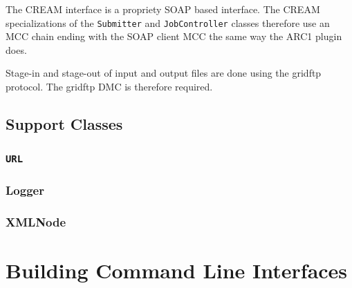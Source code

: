 \documentclass{book}
\newcommand{\Submitter}{\texttt{Submitter}}
\newcommand{\JobController}{\texttt{JobController}}
\newcommand{\URL}{\texttt{URL}}
\begin{document}
The CREAM interface is a propriety SOAP based interface. The CREAM
specializations of the {\Submitter} and {\JobController} classes
therefore use an MCC chain ending with the SOAP client MCC the same 
way the ARC1 plugin does.

Stage-in and stage-out of input and output files are done using the
gridftp protocol. The gridftp DMC is therefore required.

\section{Support Classes}
\subsection{{\URL}}
\subsection{Logger}
\subsection{XMLNode}

\chapter{Building Command Line Interfaces}
\label{sec:cli}


\end{document}

